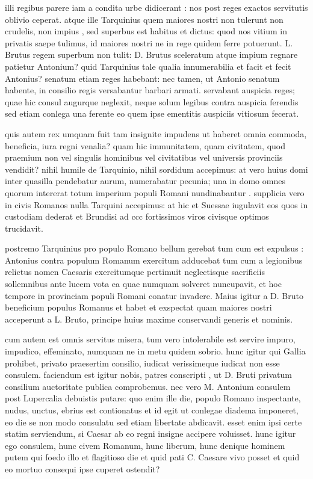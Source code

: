  illi regibus parere iam a condita urbe didicerant : nos post reges exactos servitutis oblivio ceperat. atque ille Tarquinius quem maiores nostri non tulerunt non crudelis, non impius , sed superbus est habitus et dictus: quod nos vitium in privatis saepe tulimus, id maiores nostri ne in rege quidem ferre potuerunt. L. Brutus regem superbum non tulit: D. Brutus sceleratum atque impium regnare patietur Antonium? quid Tarquinius tale qualia innumerabilia et facit et fecit Antonius? senatum etiam reges habebant: nec tamen, ut Antonio senatum habente, in consilio regis versabantur barbari armati. servabant auspicia reges; quae hic consul augurque neglexit, neque solum legibus contra auspicia ferendis sed etiam conlega una ferente eo quem ipse ementitis auspiciis vitiosum fecerat.

 quis autem rex umquam fuit tam insignite impudens ut haberet omnia commoda, beneficia, iura regni venalia? quam hic immunitatem, quam civitatem, quod praemium non vel singulis hominibus vel civitatibus vel universis provinciis vendidit? nihil humile de Tarquinio, nihil sordidum accepimus: at vero huius domi inter quasilla pendebatur aurum, numerabatur pecunia; una in domo omnes quorum intererat totum imperium populi Romani nundinabantur . supplicia vero in civis Romanos nulla Tarquini accepimus: at hic et Suessae iugulavit eos quos in custodiam dederat et Brundisi ad ccc fortissimos viros civisque optimos trucidavit.

 postremo Tarquinius pro populo Romano bellum gerebat tum cum est expulsus : Antonius contra populum Romanum exercitum adducebat tum cum a legionibus relictus nomen Caesaris exercitumque pertimuit neglectisque sacrificiis sollemnibus ante lucem vota ea quae numquam solveret nuncupavit, et hoc tempore in provinciam populi Romani conatur invadere. Maius igitur a D. Bruto beneficium populus Romanus et habet et exspectat quam maiores nostri acceperunt a L. Bruto, principe huius maxime conservandi generis et nominis.

 cum autem est omnis servitus misera, tum vero intolerabile est servire impuro, impudico, effeminato, numquam ne in metu quidem sobrio. hunc igitur qui Gallia prohibet, privato praesertim consilio, iudicat verissimeque iudicat non esse consulem. faciendum est igitur nobis, patres conscripti , ut D. Bruti privatum consilium auctoritate publica comprobemus. nec vero M. Antonium consulem post Lupercalia debuistis putare: quo enim ille die, populo Romano inspectante, nudus, unctus, ebrius est contionatus et id egit ut conlegae diadema imponeret, eo die se non modo consulatu sed etiam libertate abdicavit. esset enim ipsi certe statim serviendum, si Caesar ab eo regni insigne accipere voluisset. hunc igitur ego consulem, hunc civem Romanum, hunc liberum, hunc denique hominem putem qui foedo illo et flagitioso die et quid pati C. Caesare vivo posset et quid eo mortuo consequi ipse cuperet ostendit?

